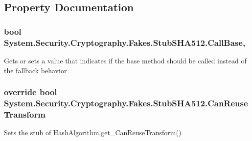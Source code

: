 \subsection{Property Documentation}
\hypertarget{class_system_1_1_security_1_1_cryptography_1_1_fakes_1_1_stub_s_h_a512_a86ab9ea9414af20b6010dbd7f4a85117}{
\subsubsection[{Call\-Base}]{\setlength{\rightskip}{0pt plus 5cm}bool System.\-Security.\-Cryptography.\-Fakes.\-Stub\-S\-H\-A512.\-Call\-Base\hspace{0.3cm}{\ttfamily [get]}, {\ttfamily [set]}}}\label{class_system_1_1_security_1_1_cryptography_1_1_fakes_1_1_stub_s_h_a512_a86ab9ea9414af20b6010dbd7f4a85117}


Gets or sets a value that indicates if the base method should be called instead of the fallback behavior

\hypertarget{class_system_1_1_security_1_1_cryptography_1_1_fakes_1_1_stub_s_h_a512_addd38b606e85bf1ca4df958a921d7544}{
\subsubsection[{Can\-Reuse\-Transform}]{\setlength{\rightskip}{0pt plus 5cm}override bool System.\-Security.\-Cryptography.\-Fakes.\-Stub\-S\-H\-A512.\-Can\-Reuse\-Transform\hspace{0.3cm}{\ttfamily [get]}}}\label{class_system_1_1_security_1_1_cryptography_1_1_fakes_1_1_stub_s_h_a512_addd38b606e85bf1ca4df958a921d7544}


Sets the stub of Hash\-Algorithm.\-get\-\_\-\-Can\-Reuse\-Transform()

